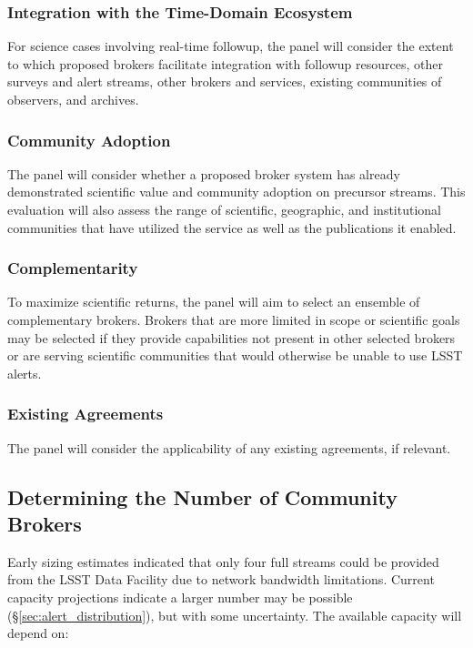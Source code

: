 \subsubsection{Integration with the Time-Domain Ecosystem}

For science cases involving real-time followup, the panel will consider the extent to which proposed brokers facilitate integration with followup resources, other surveys and alert streams, other brokers and services, existing communities of observers, and archives.  	


\subsubsection{Community Adoption}

The panel will consider whether a proposed broker system has already demonstrated scientific value and community adoption on precursor streams.  
This evaluation will also assess the 
range of scientific, geographic, and institutional communities that have utilized the service as well as the publications it enabled.


\subsubsection{Complementarity}

To maximize scientific returns, the panel will aim to select an ensemble of complementary brokers.
Brokers that are more limited in scope or scientific goals may be selected if they provide capabilities not present in other selected brokers or are serving scientific communities that would otherwise be unable to use LSST alerts.

\subsubsection{Existing Agreements}

The panel will consider the applicability of any existing agreements, if relevant.

\subsection{Determining the Number of Community Brokers} \label{sec:numbrokers}

Early sizing estimates indicated that only four full streams could be provided from the LSST Data Facility due to network bandwidth limitations.  
Current capacity projections indicate a larger number may be possible (\S \ref{sec:alert_distribution}), but with some uncertainty.
The available capacity will depend on:

